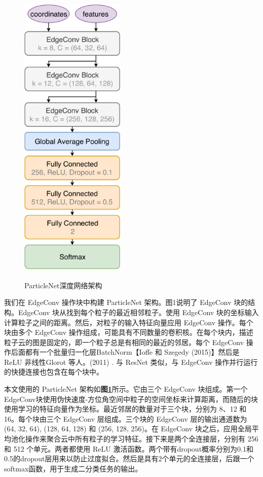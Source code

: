 \begin{figure}[H]
 \centering
 \caption{ParticleNet深度网络架构\cite{PaticleNet}}
 \includegraphics[height=14cm, width=5cm]{pictures/ParticleNet_Architecture.png}
 \label{fig:4.2}
\end{figure}

我们在 EdgeConv 操作块中构建 ParticleNet 架构。图1说明了 EdgeConv 块的结构。EdgeConv 块从找到每个粒子的最近相邻粒子。使用 EdgeConv 块的坐标输入计算粒子之间的距离。然后，对粒子的输入特征向量应用 EdgeConv 操作。每个块由多个 EdgeConv 操作组成，可能具有不同数量的卷积核。在每个块内，描述粒子云的图是固定的，即一个粒子总是有相同的最近的邻居。每个 EdgeConv 操作后面都有一个批量归一化层BatchNorm【Ioffe 和 Szegedy (2015)】然后是 ReLU 非线性Glorot 等人。(2011) . 与 ResNet 类似，与 EdgeConv 操作并行运行的快捷连接也包含在每个块中。


本文使用的 ParticleNet 架构如\textbf{图\ref{fig:4.2}}所示。它由三个 EdgeConv 块组成。第一个EdgeConv块使用伪快速度-方位角空间中粒子的空间坐标来计算距离，而随后的块使用学习的特征向量作为坐标。最近邻居的数量对于三个块，分别为 8、12 和 16。每个块由三个 EdgeConv 层组成。三个块的 EdgeConv 层的输出通道数为 (64, 32, 64), (128, 64, 128) 和 (256, 128, 256)。在 EdgeConv 块之后，应用全局平均池化操作来聚合云中所有粒子的学习特征。接下来是两个全连接层，分别有 256 和 512 个单元。两者都使用 ReLU 激活函数。两个带有dropout概率分别为0.1和0.5的dropout层用来以防止过度拟合。然后是具有2个单元的全连接层，后跟一个softmax函数，用于生成二分类任务的输出。

